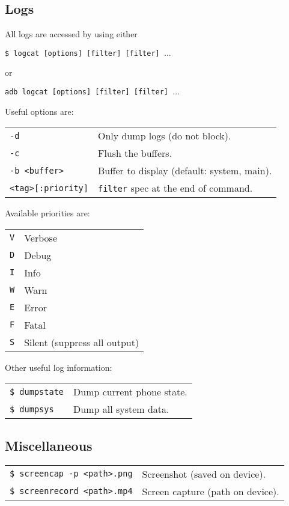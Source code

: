 \documentclass[11pt,landscape,a4paper]{article}
\begin{document}
\begin{multicols}{3}
\subsection{Logs}

All logs are accessed by using either 

\texttt{\$ logcat [options] [filter] [filter] $\ldots$} 

or 

\texttt{adb logcat [options] [filter] [filter] $\ldots$}

\vspace*{2mm}

Useful options are:

\begin{tabular}{@{}ll@{}}
\texttt{-d} & Only dump logs (do not block).\\
\texttt{-c} & Flush the buffers.\\
\texttt{-b <buffer>} & Buffer to display (default: system, main).\\
\texttt{<tag>[:priority]} & \texttt{filter} spec at the end of command.\\
\end{tabular}

\vspace*{2mm}

Available priorities are:

\begin{addmargin}{10mm}
\begin{tabular}{@{}ll@{}}
\texttt{V} & Verbose\\
\texttt{D} & Debug\\
\texttt{I} & Info\\
\texttt{W} & Warn\\
\texttt{E} & Error\\
\texttt{F} & Fatal\\
\texttt{S} & Silent (suppress all output)\\
\end{tabular}
\end{addmargin}

\vspace*{2mm}

Other useful log information:
\begin{tabular}{@{}ll@{}}
\texttt{\$ dumpstate} & Dump current phone state.\\
\texttt{\$ dumpsys} & Dump all system data.\\
\end{tabular}

\subsection{Miscellaneous}
\begin{tabular}{@{}ll@{}}
\texttt{\$ screencap -p <path>.png} & Screenshot (saved on device).\\
\texttt{\$ screenrecord <path>.mp4} & Screen capture (path on device).\\
\end{tabular}


\end{multicols}
\end{document}
